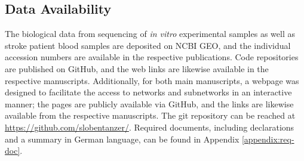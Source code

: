 \begin{spacing}{\dnormalspacing}
\newpage

\chapter*{Data Availability}
The biological data from sequencing of \emph{in vitro} experimental samples as well as stroke patient blood samples are deposited on NCBI GEO, and the individual accession numbers are available in the respective publications.\cite{Lobentanzer2019a,Winek2020} Code repositories are published on GitHub, and the web links are likewise available in the respective manuscripts. Additionally, for both main manuscripts, a webpage was designed to facilitate the access to networks and subnetworks in an interactive manner; the pages are publicly available via GitHub, and the links are likewise available from the respective manuscripts. The git repository can be reached at \url{https://github.com/slobentanzer/}. Required documents, including declarations and a summary in German language, can be found in Appendix \ref{appendix:req-doc}.

\end{spacing}